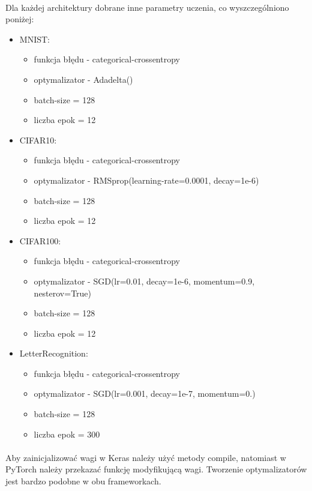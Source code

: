 \documentclass[a4paper,11pt]{article}
\begin{document}
\paragraph{}Dla każdej architektury dobrane inne parametry uczenia, co wyszczególniono poniżej:
\begin{itemize}
\item MNIST:
\begin{itemize}
\item funkcja błędu - categorical-crossentropy
\item optymalizator  - Adadelta()
\item batch-size = 128
\item liczba epok = 12
\end{itemize}
\item CIFAR10:
\begin{itemize}
\item funkcja błędu - categorical-crossentropy
\item optymalizator  - RMSprop(learning-rate=0.0001, decay=1e-6)
\item batch-size = 128
\item liczba epok = 12
\end{itemize}
\item CIFAR100:
\begin{itemize}
\item funkcja błędu - categorical-crossentropy
\item optymalizator  - SGD(lr=0.01, decay=1e-6, momentum=0.9, nesterov=True)
\item batch-size = 128
\item liczba epok = 12
\end{itemize}
\item LetterRecognition:
\begin{itemize}
\item funkcja błędu - categorical-crossentropy
\item optymalizator  - SGD(lr=0.001, decay=1e-7, momentum=0.)
\item batch-size = 128
\item liczba epok = 300
\end{itemize}
\end{itemize}
\paragraph{}Aby zainicjalizować wagi w Keras należy użyć metody compile, natomiast w PyTorch należy przekazać funkcję modyfikującą wagi. Tworzenie optymalizatorów jest bardzo podobne w obu frameworkach.
\end{document}
